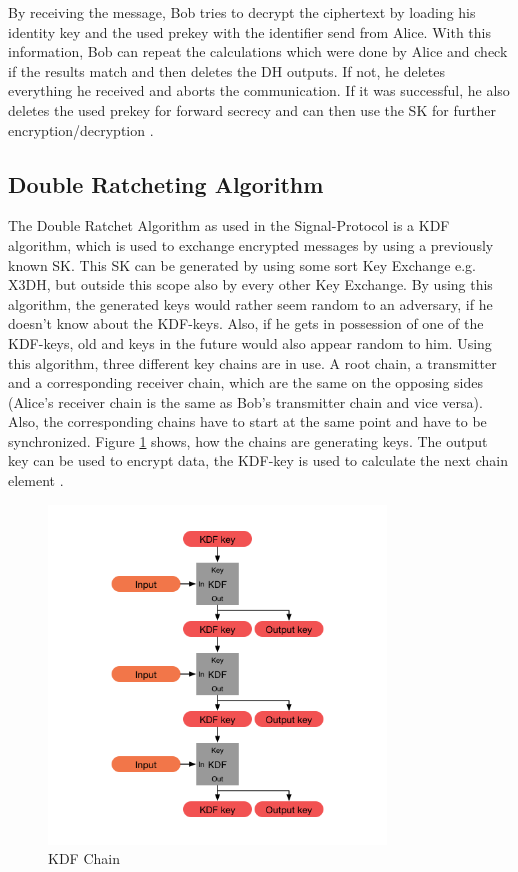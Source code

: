 \documentclass[12pt,oneside,a4paper,parskip]{scrbook}
\begin{document}
By receiving the message, Bob tries to decrypt the ciphertext by loading his identity key and the used prekey with the identifier send from Alice. With this information, Bob can repeat the calculations which were done by Alice and check if the results match and then deletes the DH outputs. If not, he deletes everything he received and aborts the communication. If it was successful, he also deletes the used prekey for forward secrecy and can then use the SK for further encryption/decryption \parencite{marlinspike_x3dh_2016}.

\subsection{Double Ratcheting Algorithm}
\label{subsec:double_ratchet}

The Double Ratchet Algorithm as used in the Signal-Protocol is a KDF algorithm, which is used to exchange encrypted messages by using a previously known SK. This SK can be generated by using some sort Key Exchange e.g. X3DH, but outside this scope also by every other Key Exchange. By using this algorithm, the generated keys would rather seem random to an adversary, if he doesn't know about the KDF-keys. Also, if he gets in possession of one of the KDF-keys, old and keys in the future would also appear random to him. Using this algorithm, three different key chains are in use. A root chain, a transmitter and a corresponding receiver chain, which are the same on the opposing sides (Alice's receiver chain is the same as Bob's transmitter chain and vice versa). Also, the corresponding chains have to start at the same point and have to be synchronized. Figure \ref{fig:KDF_Chain} shows, how the chains are generating keys. The output key can be used to encrypt data, the KDF-key is used to calculate the next chain element \parencite{perrin_double_2016}.

\begin{figure}[ht]
	\centering
  \includegraphics[width=0.8\textwidth]{ressources/kdf_chain.png}
  \caption{KDF Chain \parencite{perrin_double_2016}}
  \label{fig:KDF_Chain}
\end{figure}
\end{document}
